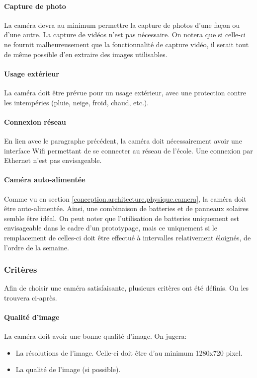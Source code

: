 \paragraph{Capture de photo}
La caméra devra au minimum permettre la capture de photos d'une façon ou d'une autre. La capture de vidéos n'est pas nécessaire.  On notera que si celle-ci ne fournit malheureusement que la fonctionnalité de capture vidéo, il serait tout de même possible d'en extraire des images utilisables. 

\paragraph{Usage extérieur}
La caméra doit être prévue pour un usage extérieur, avec une protection contre les intempéries (pluie, neige, froid, chaud, etc.).

\paragraph{Connexion réseau}
En lien avec le paragraphe précédent, la caméra doit nécessairement avoir une interface Wifi permettant de se connecter au réseau de l'école. Une connexion par Ethernet n'est pas envisageable.

\paragraph{Caméra auto-alimentée}
Comme vu en section \ref{conception.architecture.physique.camera}, la caméra doit être auto-alimentée. Ainsi, une combinaison de batteries et de panneaux solaires semble être idéal. On peut noter que l'utilisation de batteries uniquement est envisageable dans le cadre d'un prototypage, mais ce uniquement si le remplacement de celles-ci doit être effectué à intervalles relativement éloignés, de l'ordre de la semaine.

\subsubsection{Critères}
Afin de choisir une caméra satisfaisante, plusieurs critères ont été définis. On les trouvera ci-après.

\paragraph{Qualité d'image}
La caméra doit avoir une bonne qualité d'image. On jugera:
\begin{itemize}
    \item La résolutions de l'image. Celle-ci doit être d'au minimum 1280x720 pixel.
    \item La qualité de l'image (si possible).
\end{itemize}

